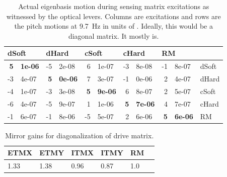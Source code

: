 



\begin{table}
\centering
\caption[Actual eigenbasis motion during sensing matrix excitations]{Actual eigenbasis motion during sensing matrix excitations as
  witnessed by the optical levers. Columns are excitations and rows are
  the pitch motions at 9.7~Hz in units of \microrad. Ideally, this
  would be a diagonal matrix. It mostly is.}
\begin{tabular}{r@{.}l r@{.}l r@{.}l r@{.}l r@{.}l l}
\hline
\multicolumn{2}{l}{dSoft} & \multicolumn{2}{l}{dHard}  & \multicolumn{2}{l}{cSoft} & \multicolumn{2}{l}{cHard} & \multicolumn{2}{l}{RM} & \\
\hline
   \textbf{5}&\textbf{1e-06} & -5&2e-08  & 6&1e-07 & -3&8e-08 &  -1&8e-07 & dSoft\\
  -3&4e-07 &  \textbf{5}&\textbf{0e-06}  &  7&3e-07 & -1&0e-06 &  2&4e-07 & dHard\\
  -4&1e-07 & -3&3e-08 &  \textbf{5}&\textbf{9e-06} &  6&8e-07 &  2&5e-07 & cSoft\\
  -6&4e-07 & -5&9e-07 &  1&1e-06 &  \textbf{5}&\textbf{7e-06} &  4&7e-07 & cHard\\
  -1&6e-07 & -1&8e-06 & -5&5e-07 &   2&6e-06 &  \textbf{5}&\textbf{6e-06} & RM\\
\hline
\end{tabular}
\label{table:excitations_calibrated}
\end{table}



\begin{table}
\centering
\caption[Mirror gains for diagonalization of drive matrix]{Mirror
  gains for diagonalization of drive matrix.} 
\begin{tabular}{l l l l l l}
\hline
ETMX & ETMY & ITMX & ITMY & RM & \\
\hline
1.33 & 1.38 & 0.96 & 0.87 & 1.0 \\
\hline
\end{tabular}
\label{table:mirrorgains}
\end{table}




